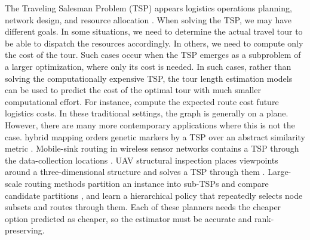 \documentclass{article}
\begin{document}
The Traveling Salesman Problem (TSP) %
appears logistics operations planning, network design, and resource allocation \citep{chien1992operational, concorde2006}. 
When solving the TSP, we may have different goals. 
In some situations, we need to determine the actual travel tour to be able to dispatch the resources accordingly.
In others, we need to compute only the cost of the tour.
Such cases occur when the TSP emerges as a subproblem of a larger optimization, where only its cost is needed. 
In such cases, rather than solving the computationally expensive TSP, the tour length estimation models can be used to predict the cost of the optimal tour with much smaller computational effort.
For instance, compute the expected route cost future logistics costs.
In these traditional settings, the graph is generally on a plane.
However, there are many more contemporary applications where this is not the case.
 hybrid mapping orders genetic markers by a TSP over an abstract similarity metric \citep{agarwala2000fast}. Mobile-sink routing in wireless sensor networks contains a TSP through the data-collection locations \citep{yuan2010racetrack}. UAV structural inspection places viewpoints around a three-dimensional structure and solves a TSP through them \citep{bircher2016threedimensional}. Large-scale routing methods partition an instance into sub-TSPs and compare candidate partitions \citep{frontiers2021}, and \citet{aaai2023} learn a hierarchical policy that repeatedly selects node subsets and routes through them. 
Each of these planners needs the cheaper option predicted as cheaper, so the estimator must be accurate and rank-preserving.


\end{document}
